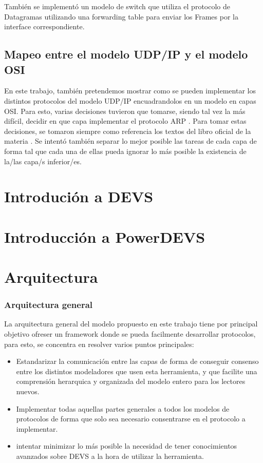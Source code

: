 \documentclass[10pt,a4paper]{article}
\begin{document}
También se implementó un modelo de switch que utiliza el protocolo de Datagramas \cite{petersonSwitchDatagram} utilizando una forwarding table para enviar los Frames por la interface correspondiente. 

\subsection{Mapeo entre el modelo UDP/IP y el modelo OSI}

En este trabajo, también pretendemos mostrar como se pueden implementar los distintos protocolos del modelo UDP/IP encuadrandolos en un modelo en capas OSI. Para esto, varias decisiones tuvieron que tomarse, siendo tal vez la más difícil, decidir en que capa implementar el protocolo ARP \cite[p.~228]{peterson2007computer}. Para tomar estas decisiones, se tomaron siempre como referencia los textos del libro oficial de la materia \cite{peterson2007computer}. Se intentó también separar lo mejor posible las tareas de cada capa de forma tal que cada una de ellas pueda ignorar lo más posible la existencia de la/las capa/s inferior/es.

\section{Introdución a DEVS}
\section{Introducción a PowerDEVS}
\section{Arquitectura}

\subsubsection{Arquitectura general}
La arquitectura general del modelo propuesto en este trabajo tiene por principal objetivo ofreser un framework donde se pueda facilmente desarrollar protocolos, para esto, se concentra en resolver varios puntos principales:

\begin{itemize}
\item Estandarizar la comunicación entre las capas de forma de conseguir consenso entre los distintos modeladores que usen esta herramienta, y que facilite una comprensión herarquica y organizada del modelo entero para los lectores nuevos.
\item Implementar todas aquellas partes generales a todos los modelos de protocolos de forma que solo sea necesario consentrarse en el protocolo a implementar.
\item intentar minimizar lo más posible la necesidad de tener conocimientos avanzados sobre DEVS a la hora de utilizar la herramienta.
\end{itemize}
\end{document}
